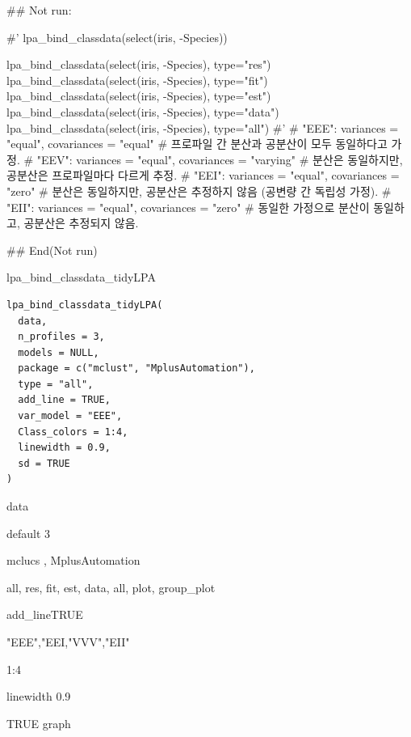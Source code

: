 \documentclass[a4paper]{book}
\begin{document}
\begin{Examples}
\begin{ExampleCode}

## Not run: 

#'
lpa_bind_classdata(select(iris, -Species))

lpa_bind_classdata(select(iris, -Species), type="res")
lpa_bind_classdata(select(iris, -Species), type="fit")
lpa_bind_classdata(select(iris, -Species), type="est")
lpa_bind_classdata(select(iris, -Species), type="data")%
lpa_bind_classdata(select(iris, -Species), type="all")
#'
# "EEE": variances = "equal", covariances = "equal"
# 프로파일 간 분산과 공분산이 모두 동일하다고 가정.
# "EEV": variances = "equal", covariances = "varying"
# 분산은 동일하지만, 공분산은 프로파일마다 다르게 추정.
# "EEI": variances = "equal", covariances = "zero"
# 분산은 동일하지만, 공분산은 추정하지 않음 (공변량 간 독립성 가정).
# "EII": variances = "equal", covariances = "zero"
# 동일한 가정으로 분산이 동일하고, 공분산은 추정되지 않음.

## End(Not run)



\end{ExampleCode}
\end{Examples}
%
\begin{Description}
lpa\_bind\_classdata\_tidyLPA
\end{Description}
%
\begin{Usage}
\begin{verbatim}
lpa_bind_classdata_tidyLPA(
  data,
  n_profiles = 3,
  models = NULL,
  package = c("mclust", "MplusAutomation"),
  type = "all",
  add_line = TRUE,
  var_model = "EEE",
  Class_colors = 1:4,
  linewidth = 0.9,
  sd = TRUE
)
\end{verbatim}
\end{Usage}
%
\begin{Arguments}
\begin{ldescription}
\item[\code{data}] data

\item[\code{n\_profiles}] default 3

\item[\code{package}] mclucs , MplusAutomation

\item[\code{type}] all, res, fit, est, data, all, plot, group\_plot

\item[\code{add\_line}] add\_lineTRUE

\item[\code{var\_model}] "EEE","EEI,"VVV","EII"

\item[\code{Class\_colors}] 1:4

\item[\code{linewidth}] linewidth 0.9

\item[\code{sd}] TRUE graph
\end{ldescription}
\end{Arguments}
\end{document}
